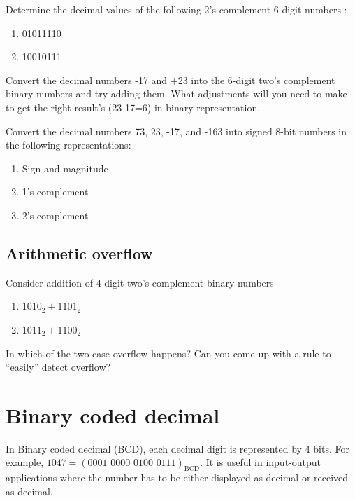 \begin{prob}
  Determine the decimal values of the following 2’s complement 6-digit numbers :
  \begin{enumerate}
  \item 01011110
  \item 10010111
  \end{enumerate}
\end{prob}
\vspace{10em}

\begin{prob}
  Convert the decimal numbers -17 and +23 into the 6-digit two's complement binary numbers and try adding them. What adjustments will you need to make to get the right result's (23-17=6) in binary representation.
\end{prob}
\vspace{20em}

\begin{prob}
  Convert the decimal numbers 73, 23, -17, and -163 into signed 8-bit numbers in the
  following representations:
  \begin{enumerate}
    \item Sign and magnitude
    \item 1’s complement
    \item 2’s complement
  \end{enumerate}
\end{prob}
\vspace{20em}


\subsection{Arithmetic overflow}
\begin{prob}
  Consider addition of 4-digit two's complement binary numbers
  \begin{enumerate}
  \item $1010_2 + 1101_2$
  \item $1011_2 + 1100_2$
  \end{enumerate}
  In which of the two case overflow happens? Can you come up with a rule to ``easily'' detect overflow?
\end{prob}
\vspace{20em}

\section{Binary coded decimal}
In Binary coded decimal (BCD), each decimal digit is represented by 4 bits. For
example, $1047 = (0001\_0000\_0100\_0111)_{\text{BCD}}$. It is useful in
input-output applications where the number has to be either displayed as decimal
or received as decimal.

